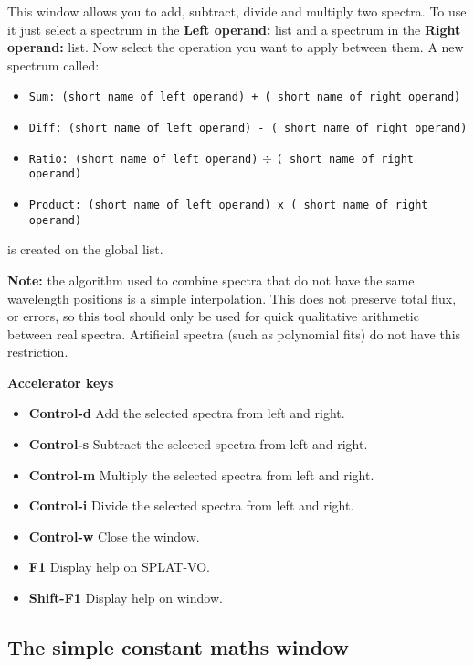 \documentclass[twoside,11pt,nolof]{starlink}
\providecommand{\SPLAT}{\textsf{SPLAT-VO}}
\newcommand{\labelitem}[1]{\textbf{#1}}
\providecommand{\hitext}[1]{\texttt{#1}}
\providecommand{\subheading}[1]{\textbf{\large{#1}}}
\begin{document}
This window allows you to add, subtract, divide and multiply two spectra. To
use it just select a spectrum in the
\labelitem{Left operand:} list and a spectrum in the
\labelitem{Right operand:} list. Now select the operation you want to
apply between them. A new spectrum called:
\begin{itemize}
  \item \hitext{Sum: (short name of left operand) + ( short name of
        right operand)}
  \item \hitext{Diff: (short name of left operand) - ( short name of
        right operand)}
  \item \hitext{Ratio: (short name of left operand)} $\div$ \hitext{( short
        name of right operand)}
  \item \hitext{Product: (short name of left operand) x ( short name
        of right operand)}
\end{itemize}
is created on the global list.

\textbf{Note:} the algorithm used to combine spectra that do not have
the same wavelength positions is a simple interpolation. This does not
preserve total flux, or errors, so this tool should only be used for
quick qualitative arithmetic between real spectra. Artificial spectra
(such as polynomial fits) do not have this restriction.

\subheading{Accelerator keys}

\begin{itemize}
\item \labelitem{Control-d} Add the selected spectra from left and right.
\item \labelitem{Control-s} Subtract the selected spectra from left and right.
\item \labelitem{Control-m} Multiply the selected spectra from left and right.
\item \labelitem{Control-i} Divide the selected spectra from left and right.
\item \labelitem{Control-w} Close the window.
\item \labelitem{F1} Display help on \SPLAT.
\item \labelitem{Shift-F1} Display help on window.
\end{itemize}


\newpage
\subsection{The simple constant maths window}
\end{document}

